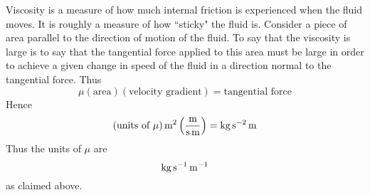 Viscosity is a measure of how much internal friction is experienced when the
fluid moves. It is roughly a measure of how \textquotedblleft sticky" the
fluid is. Consider a piece of area parallel to the direction of motion of
the fluid. To say that the viscosity is large is to say that the tangential
force applied to this area must be large in order to achieve a given change
in speed of the fluid in a direction normal to the tangential force. Thus
\begin{equation*}
\mu (\text{area}) (\text{velocity gradient}) =\text{
tangential force}
\end{equation*}
Hence
\begin{equation*}
(\mbox{\rm units of $\mu$}) \mathop{\textrm{\rm m}}\nolimits^{2}\left(\frac{\mathop{\textrm{\rm m}}\nolimits}{\mathop{\textrm{\rm s}}\nolimits \mathop{\textrm{\rm m}}\nolimits}\right)
=\mathop{\textrm{\rm kg}}\nolimits\mathop{\textrm{\rm s}}\nolimits ^{-2}\mathop{\textrm{\rm m}}\nolimits
\end{equation*}
Thus the units of $\mu $ are
\begin{equation*}
\mathop{\textrm{\rm kg}}\nolimits\mathop{\textrm{\rm s}}\nolimits ^{-1}\mathop{\textrm{\rm m}}\nolimits^{-1}
\end{equation*}
as claimed above.


